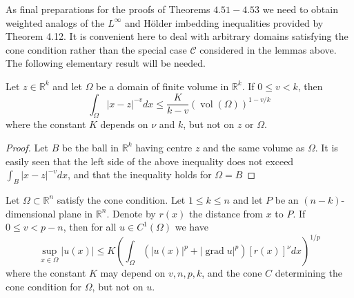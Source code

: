 As final preparations for the proofs of Theorems $4.51-4.53$ we need to obtain weighted analogs of the $L^{\infty}$ and Hölder imbedding inequalities provided by Theorem 4.12. It is convenient here to deal with arbitrary domains satisfying the cone condition rather than the special case $\mathcal{C}$ considered in the lemmas above. The following elementary result will be needed.


\begin{lemma}
  Let $z \in \mathbb{R}^k$ and let $\Omega$ be a domain of finite volume in $\mathbb{R}^k$. If $0 \leq v<k$, then
  \[
  \int_{\Omega}|x-z|^{-v} d x \leq \frac{K}{k-v}(\operatorname{vol}(\Omega))^{1-v / k}
  \]
  where the constant $K$ depends on $\nu$ and $k$, but not on $z$ or $\Omega$.
\end{lemma}

\begin{proof}
  Let $B$ be the ball in $\mathbb{R}^k$ having centre $z$ and the same volume as $\Omega$. It is easily seen that the left side of the above inequality does not exceed $\int_B|x-z|^{-v} d x$, and that the inequality holds for $\Omega=B$
\end{proof}


\begin{lemma}
  Let $\Omega \subset \mathbb{R}^n$ satisfy the cone condition. Let $1 \leq k \leq n$ and let $P$ be an $(n-k)$-dimensional plane in $\mathbb{R}^n$. Denote by $r(x)$ the distance from $x$ to $P$. If $0 \leq v<p-n$, then for all $u \in C^1(\Omega)$ we have
  \[
  \sup _{x \in \Omega}|u(x)| \leq K\left(\int_{\Omega}\left(|u(x)|^p+|\operatorname{grad} u|^p\right)[r(x)]^\nu d x\right)^{1 / p}
  \]
  where the constant $K$ may depend on $v, n, p, k$, and the cone $C$ determining the cone condition for $\Omega$, but not on $u$.
\end{lemma}

